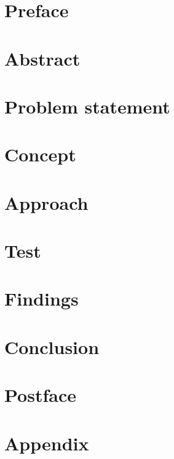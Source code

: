 \documentclass[a4paper,10pt,titlepage,twocolumn]{report}
\begin{document}

\newpage


\newpage
{}

\newcommand{\todo}[1]{\textbf{\textsc{\textcolor{red}{[#1]}}}}

\chapter*{Preface}

\label{preface}

\chapter*{Abstract}

\label{abstract}

\chapter*{Problem statement}
\label{problem}


\chapter*{Concept}
\label{concept}


\chapter*{Approach}
\label{approach}


\chapter*{Test}
\label{test}


\chapter*{Findings}
\label{findings}


\chapter*{Conclusion}
\label{conclusion}


\chapter*{Postface}
\label{postface}


\printbibliography

\chapter*{Appendix}
\label{appendix}

\end{document}
